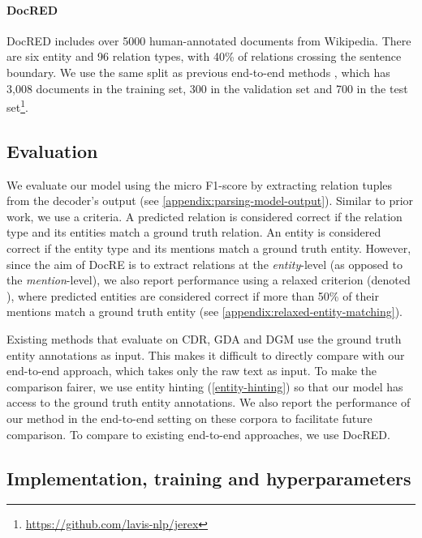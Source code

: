 \documentclass[11pt]{article}
\begin{document}
\paragraph{DocRED \citep{Yao2019DocREDAL}}

DocRED includes over 5000 human-annotated documents from Wikipedia. There are six entity and 96 relation types, with 40\% of relations crossing the sentence boundary. We use the same split as previous end-to-end methods \citep{eberts-ulges-2021-end}, which has 3,008 documents in the training set, 300 in the validation set and 700 in the test set\footnote{\url{https://github.com/lavis-nlp/jerex}}.

\subsection{Evaluation}

We evaluate our model using the micro F1-score by extracting relation tuples from the decoder's output (see \autoref{appendix:parsing-model-output}). Similar to prior work, we use a  criteria. A predicted relation is considered correct if the relation type and its entities match a ground truth relation. An entity is considered correct if the entity type and its mentions match a ground truth entity. However, since the aim of DocRE is to extract relations at the \textit{entity}-level (as opposed to the \textit{mention}-level), we also report performance using a relaxed criterion (denoted ), where predicted entities are considered correct if more than 50\% of their mentions match a ground truth entity (see \autoref{appendix:relaxed-entity-matching}).

Existing methods that evaluate on CDR, GDA and DGM use the ground truth entity annotations as input. This makes it difficult to directly compare with our end-to-end approach, which takes only the raw text as input. To make the comparison fairer, we use entity hinting (\textsection \ref{entity-hinting}) so that our model has access to the ground truth entity annotations. We also report the performance of our method in the end-to-end setting on these corpora to facilitate future comparison. To compare to existing end-to-end approaches, we use DocRED.

\subsection{Implementation, training and hyperparameters}
\end{document}
